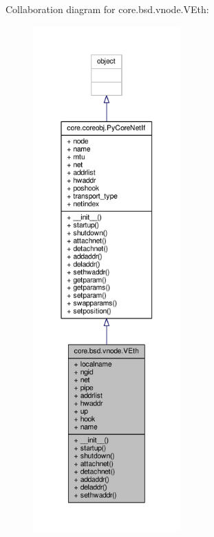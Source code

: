 Collaboration diagram for core.\+bsd.\+vnode.\+V\+Eth\+:
\nopagebreak
\begin{figure}[H]
\begin{center}
\leavevmode
\includegraphics[height=550pt]{classcore_1_1bsd_1_1vnode_1_1_v_eth__coll__graph}
\end{center}
\end{figure}
